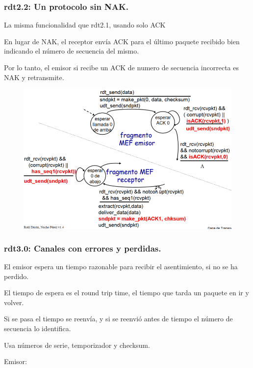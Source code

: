 \documentclass[12pt, twoside, openright]{report} %
\begin{document}
\subsubsection{rdt2.2: Un protocolo sin NAK.}


La misma funcionalidad que rdt2.1, usando solo ACK

En lugar de NAK, el receptor envía ACK para el último paquete
recibido bien indicando el número de secuencia del mismo.

Por lo tanto, el emisor si recibe un ACK de numero de secuencia
incorrecta es NAK y retransmite.
\begin{figure}[H]
	{\includegraphics[scale=.45]{Untitled 14.png}}
\end{figure}
\subsubsection{rdt3.0: Canales con errores y perdidas.}


El emisor espera un tiempo razonable para recibir el asentimiento,
si no se ha perdido.

El tiempo de espera es el round trip time, el tiempo que tarda un
paquete en ir y volver.

Si se pasa el tiempo se reenvía, y si se reenvió antes de tiempo
el número de secuencia lo identifica.

Usa números de serie, temporizador y checksum.

Emisor:
\end{document}
